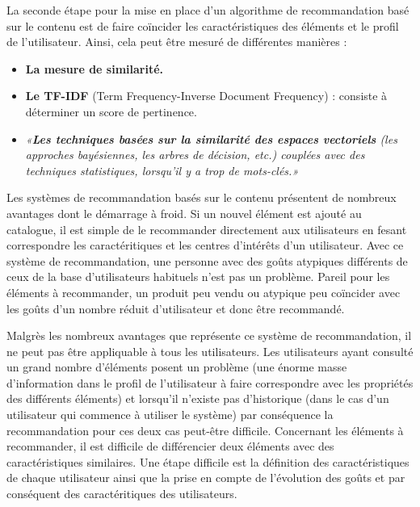 \vspace{5mm}


La seconde étape pour la mise en place d'un algorithme de recommandation basé sur le contenu est de faire coïncider les caractéristiques des éléments et le profil de l’utilisateur. Ainsi, cela peut être mesuré de différentes manières :

\vspace{5mm}


\begin{itemize}
    \item \textbf{La mesure de similarité.}
    \vspace{2mm}
    \item \textbf{Le TF-IDF} (Term Frequency-Inverse Document Frequency) : consiste à déterminer un score de pertinence.  
    \vspace{2mm}
    \item \textit{«\textbf{Les techniques basées sur la similarité des espaces vectoriels} (les approches bayésiennes, les arbres de décision, etc.) couplées avec des techniques statistiques, lorsqu’il y a trop de mots-clés.»}\supercite{elsaNegre}

\end{itemize}

\vspace{5mm}



Les systèmes de recommandation basés sur le contenu présentent de nombreux avantages dont le démarrage à froid. Si un nouvel élément est ajouté au catalogue, il est simple de le recommander directement aux utilisateurs en fesant correspondre les caractéritiques et les centres d'intérêts d'un utilisateur. Avec ce système de recommandation, une personne avec des goûts atypiques différents de ceux de la base d'utilisateurs habituels n'est pas un problème. Pareil pour les éléments à recommander, un produit peu vendu ou atypique peu coïncider avec les goûts d'un nombre réduit d'utilisateur et donc être recommandé. 

\vspace{5mm} 

Malgrès les nombreux avantages que représente ce système de recommandation, il ne peut pas être appliquable à tous les utilisateurs. Les utilisateurs ayant consulté un grand nombre d’éléments posent un problème (une énorme masse d'information dans le profil de l’utilisateur à faire correspondre avec les propriétés des différents  éléments) et lorsqu’il n’existe pas d’historique (dans le cas d'un utilisateur qui commence à utiliser le système) par conséquence la recommandation pour ces deux cas peut-être difficile. Concernant les éléments à recommander, il est difficile de différencier deux éléments avec des caractéristiques similaires. Une étape difficile est la définition des caractéristiques de chaque utilisateur ainsi que la prise en compte de l'évolution des goûts et par conséquent des caractéritiques des utilisateurs.




